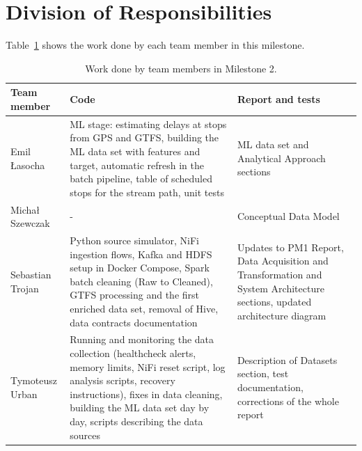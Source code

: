 \documentclass[11pt]{article}
\begin{document}
\section{Division of Responsibilities}

Table~\ref{tab:responsibilities} shows the work done by each team member in this milestone.

\begin{table}[H]
\centering
\small
\caption{Work done by team members in Milestone 2.}\label{tab:responsibilities}
\begin{tabular}{|>{\raggedright\arraybackslash}p{2.2cm}|>{\raggedright\arraybackslash}p{6.6cm}|>{\raggedright\arraybackslash}p{4.6cm}|}
\hline
\textbf{Team member} & \textbf{Code} & \textbf{Report and tests} \\
\hline
Emil Łasocha & ML stage: estimating delays at stops from GPS and GTFS, building the ML data set with features and target, automatic refresh in the batch pipeline, table of scheduled stops for the stream path, unit tests & ML data set and Analytical Approach sections \\
\hline
Michał Szewczak & - & Conceptual Data Model \\
\hline
Sebastian Trojan & Python source simulator, NiFi ingestion flows, Kafka and HDFS setup in Docker Compose, Spark batch cleaning (Raw to Cleaned), GTFS processing and the first enriched data set, removal of Hive, data contracts documentation & Updates to PM1 Report, Data Acquisition and Transformation and System Architecture sections, updated architecture diagram \\
\hline
Tymoteusz Urban & Running and monitoring the data collection (healthcheck alerts, memory limits, NiFi reset script, log analysis scripts, recovery instructions), fixes in data cleaning, building the ML data set day by day, scripts describing the data sources & Description of Datasets section, test documentation, corrections of the whole report \\
\hline
\end{tabular}
\end{table}
\end{document}
